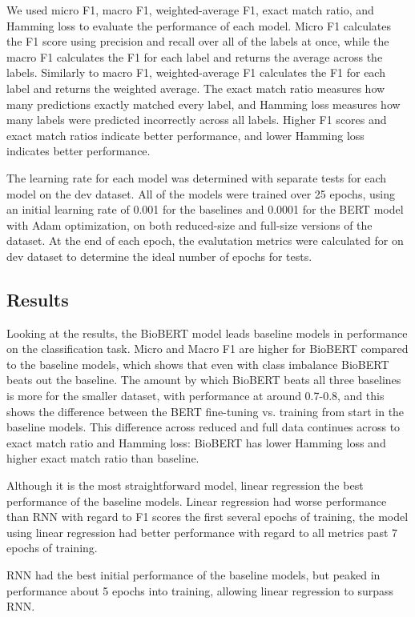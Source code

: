 \documentclass[11pt]{article}
\begin{document}
We used micro F1, macro F1, weighted-average F1, exact match ratio, and Hamming loss to evaluate
the performance of each model. Micro F1 calculates the F1 score using precision and recall over
all of the labels at once, while the macro F1 calculates the F1 for each label and returns the
average across the labels. Similarly to macro F1, weighted-average F1 calculates the F1 for each
label and returns the weighted average. The exact match ratio measures how many predictions exactly
matched every label, and Hamming loss measures how many labels were predicted incorrectly across
all labels. Higher F1 scores and exact match ratios indicate better performance, and lower Hamming
loss indicates better performance.

The learning rate for each model was determined with separate tests for each model on the dev
dataset. All of the models were trained over 25 epochs, using an initial learning rate of 0.001 for
the baselines and 0.0001 for the BERT model with Adam optimization, on both reduced-size and
full-size versions of the dataset. At the end of each epoch, the evalutation metrics were calculated
for on dev dataset to determine the ideal number of epochs for tests.

\subsection{Results}

Looking at the results, the BioBERT model leads baseline models in performance on the
classification task. Micro and Macro F1 are higher for BioBERT compared to the baseline models,
which shows that even with class imbalance BioBERT beats out the baseline. The amount by which
BioBERT beats all three baselines is more for the smaller dataset, with performance at around
0.7-0.8, and this shows the difference between the BERT fine-tuning vs. training from start in
the baseline models. This difference across reduced and full data continues across to exact match
ratio and Hamming loss: BioBERT has lower Hamming loss and higher exact match ratio than baseline.

Although it is the most straightforward model, linear regression the best performance of the
baseline models. Linear regression had worse performance than RNN with regard to F1 scores the
first several epochs of training, the model using linear regression had better performance with
regard to all metrics past 7 epochs of training.

RNN had the best initial performance of the baseline models, but peaked in performance about 5
epochs into training, allowing linear regression to surpass RNN.
\end{document}

